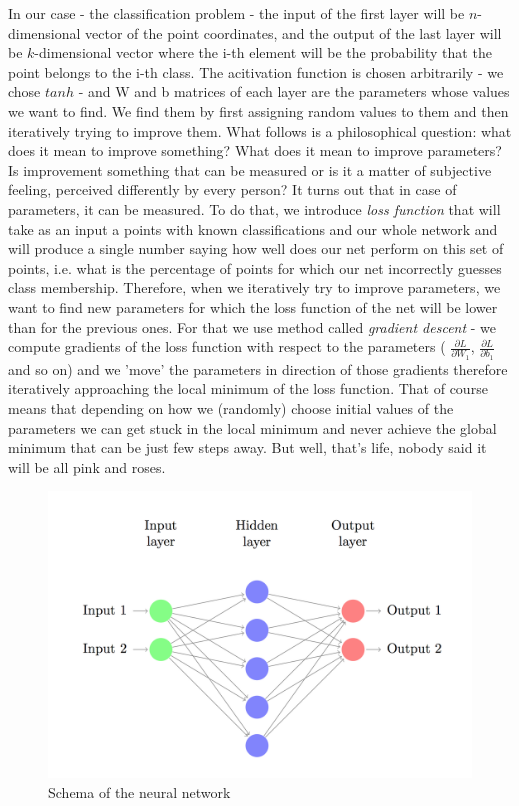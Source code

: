\documentclass[3p,twocolumn]{elsarticle}
\begin{document}
In our case - the classification problem - the input of the first layer will be $n$-dimensional vector of the point coordinates, and the output of the last layer will be $k$-dimensional vector where the i-th element will be the probability that the point belongs to the i-th class. The acitivation function is chosen arbitrarily - we chose $tanh$ - and W and b matrices of each layer are the parameters whose values we want to find. We find them by first assigning random values to them and then iteratively trying to improve them. What follows is a philosophical question: what does it mean to improve something? What does it mean to improve parameters? Is improvement something that can be measured or is it a matter of subjective feeling, perceived differently by every person? It turns out that in case of parameters, it can be measured. To do that, we introduce \emph{loss function} that will take as an input a points with known classifications and our whole network and will produce a single number saying how well does our net perform on this set of points, i.e. what is the percentage of points for which our net incorrectly guesses class membership. Therefore, when we iteratively try to improve parameters, we want to find new parameters for which the loss function of the net will be lower than for the previous ones. For that we use method called \emph{gradient descent} -  we compute gradients of the loss function with respect to the parameters ( $\frac{\partial L}{\partial W_1}$, $\frac{\partial L}{\partial b_1}$ and so on) and we 'move' the parameters in direction of those gradients therefore iteratively approaching the local minimum of the loss function. That of course means that depending on how we (randomly) choose initial values of the parameters we can get stuck in the local minimum and never achieve the global minimum that can be just few steps away. But well, that's life, nobody said it will be all pink and roses.
\begin{figure}[fig2]
	
\label{fig:fig2}
  \includegraphics[width=\linewidth]{network-schema.png}
	\caption{Schema of the neural network}
	\label{fig2}
\end{figure}
\end{document}
